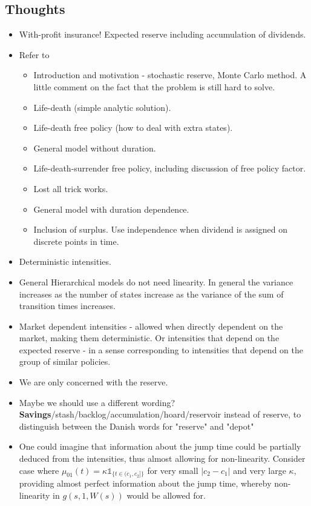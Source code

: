 \documentclass[12pt]{article}
\newcommand{\indic}[1]{\mathds{1}_{ \{ #1 \} }}
\begin{document}
\subsection*{Thoughts}
\begin{itemize}
\item With-profit insurance! Expected reserve including accumulation of dividends.
\item Refer to \citet{Norberg}
\begin{itemize}
\item Introduction and motivation - stochastic reserve, Monte Carlo method. A little comment on the fact that the problem is still hard to solve.
\item Life-death (simple analytic solution).
\item Life-death free policy (how to deal with extra states).
\item General model without duration.
\item Life-death-surrender free policy, including discussion of free policy factor.
\item Lost all trick works.
\item General model with duration dependence.
\item Inclusion of surplus. Use independence when dividend is assigned on discrete points in time.
\end{itemize}
\item Deterministic intensities.
\item General Hierarchical models do not need linearity. In general the variance increases as the number of states increase as the variance of the sum of transition times increases.
\item Market dependent intensities - allowed when directly dependent on the market, making them deterministic. Or intensities that depend on the expected reserve - in a sense corresponding to intensities that depend on the group of similar policies.
\item We are only concerned with the reserve.
\item Maybe we should use a different wording? \textbf{Savings}/stash/backlog/accumulation/hoard/reservoir instead of reserve, to distinguish between the Danish words for "reserve" and "depot"
\item One could imagine that information about the jump time could be partially deduced from the intensities, thus almost allowing for non-linearity. Consider case where $\mu_{01}(t)= \kappa \indic{t \in (c_1,c_2]}$ for very small $|c_2-c_1|$ and very large $\kappa$, providing almost perfect information about the jump time, whereby non-linearity in $g(s,1,W(s))$ would be allowed for.

\end{itemize}
\end{document}
